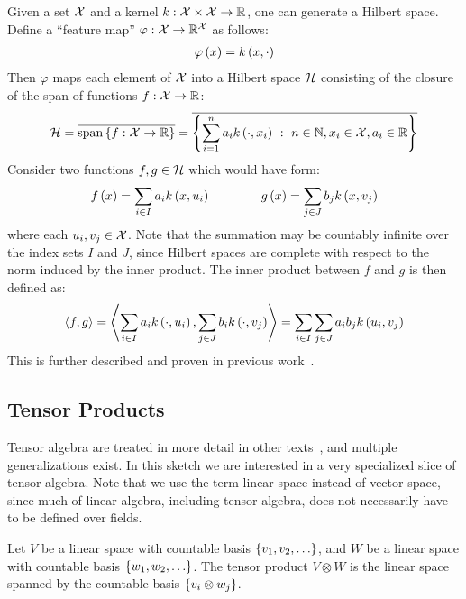 \documentclass[12pt]{article}
\begin{document}
Given a set \(\mathcal{X}\) and a kernel
\(k : \mathcal{X} \times \mathcal{X} \to \mathbb{R}\),
one can generate a Hilbert space.
Define a ``feature map'' \(\varphi : \mathcal{X} \to \mathbb{R}^{\mathcal{X}}\)
as follows:
\begin{align*}
  \varphi\left(x\right) = k\left(x, \cdot\right)
\end{align*}
Then \(\varphi\) maps each element of \(\mathcal{X}\)
into a Hilbert space \(\mathcal{H}\) consisting of the closure of
the span of functions \(f : \mathcal{X} \to \mathbb{R}\):
\begin{align*}
  \mathcal{H} =
    \overline{\mathrm{span}\left\{f : \mathcal{X} \to \mathbb{R}\right\}}
    = \overline{
        \left\{
          \sum_{i = 1}^{n} a_i k\left(\cdot, x_i\right)
            \  : \  n \in \mathbb{N}, x_i \in \mathcal{X}, a_i \in \mathbb{R}\right\}}
\end{align*}
Consider two functions \(f, g \in \mathcal{H}\) which would have form:
\begin{align*}
  f\left(x\right) = \sum_{i \in I} a_i k\left(x, u_i\right)
  \qquad \qquad
  g\left(x\right) = \sum_{j \in J} b_j k\left(x, v_j\right)
\end{align*}
where each \(u_i, v_j \in \mathcal{X}\).
Note that the summation may be countably infinite over the index sets \(I\)
and \(J\), since Hilbert spaces are complete with
respect to the norm induced by the inner product.
The inner product between \(f\) and \(g\) is then defined as:
\begin{align*}
  \left\langle f, g\right\rangle
    = \left\langle\sum_{i \in I} a_i k\left(\cdot, u_i\right),
              \sum_{j \in J} b_i k\left(\cdot, v_j\right)\right\rangle
    = \sum_{i \in I} \sum_{j \in J} a_i b_j k\left(u_i, v_j\right)
\end{align*}
This is further described and proven in previous
work~\cite{cortes2004rational, vishwanathan2010graph}.



\subsection{Tensor Products}
Tensor algebra are treated in more detail
in other texts~\cite{itskov2007tensor},
and multiple generalizations exist.
In this sketch we are interested in a very specialized slice of
tensor algebra.
Note that we use the term linear space instead of vector space,
since much of linear algebra, including tensor algebra,
does not necessarily have to be defined over fields.

\begin{definition}
  Let \(V\) be a linear space with countable basis
  \(\left\{v_1, v_2, \ldots\right\}\),
  and \(W\) be a linear space with countable basis
  \(\left\{w_1, w_2, \ldots\right\}\).
  The tensor product \(V \otimes W\) is the linear space
  spanned by the countable basis \(\left\{v_i \otimes w_j\right\}\).
\end{definition}
\end{document}
